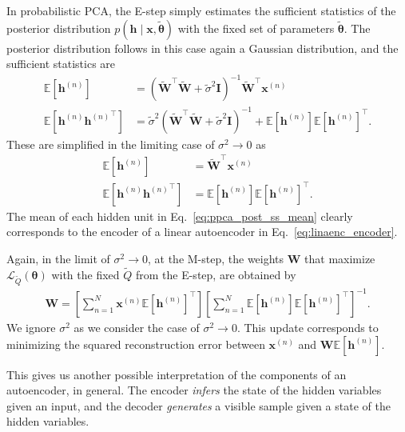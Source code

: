 \documentclass[dissertation,nocontribution,draft*]{aaltoseries}
\newcommand{\vect}[1]{\mathbf{#1}}
\newcommand{\vects}[1]{\boldsymbol{#1}}
\newcommand{\matr}[1]{\mathbf{#1}}
\newcommand{\vh}[0]{\vect{h}}
\newcommand{\vx}[0]{\vect{x}}
\newcommand{\mW}[0]{\matr{W}}
\newcommand{\mI}{\matr{I}}
\newcommand{\TT}[0]{{\vects{\theta}}}
\newcommand{\LL}[0]{\mathcal{L}}
\newcommand{\E}[0]{\mathbb{E}}
\begin{document}
In probabilistic PCA, the E-step simply estimates the
sufficient statistics of the posterior distribution $p(\vh
\mid \vx, \tilde{\TT})$ with the fixed set of parameters
$\tilde{\TT}$.
The posterior distribution follows in this case again a
Gaussian distribution, and the sufficient statistics are
\begin{align*}
    \E \left[ \vh^{(n)} \right] &= (\tilde{\mW}^\top
    \tilde{\mW} + \tilde{\sigma}^2
    \mI)^{-1} \tilde{\mW}^\top \vx^{(n)} \\
    \E \left[ \vh^{(n)} {\vh^{(n)}}^\top \right] &=
    \tilde{\sigma}^2 (\tilde{\mW}^\top \tilde{\mW} +
    \tilde{\sigma}^2
    \mI)^{-1} + \E\left[\vh^{(n)}\right] \E\left[ \vh^{(n)}
    \right]^\top.
\end{align*}
These are simplified in the limiting case of $\sigma^2 \to
0$ as
\begin{align}
    \label{eq:ppca_post_ss_mean}
    \E \left[ \vh^{(n)} \right] &= \tilde{\mW}^\top \vx^{(n)} \\
    \label{eq:ppca_post_ss_cov}
    \E \left[ \vh^{(n)} {\vh^{(n)}}^\top \right] &=
    \E\left[\vh^{(n)}\right] \E\left[ \vh^{(n)}
    \right]^\top.
\end{align}
The mean of each hidden unit in
Eq.~\eqref{eq:ppca_post_ss_mean} clearly corresponds to the
encoder of a linear autoencoder in
Eq.~\eqref{eq:linaenc_encoder}.

Again, in the limit of $\sigma^2 \to 0$, at the M-step, the
weights $\mW$ that maximize $\LL_{\tilde{Q}}(\TT)$ with the fixed
$\tilde{Q}$ from the E-step, are obtained by
\begin{align}
    \label{eq:ppca_m_weights}
    \mW = \left[ \sum_{n=1}^N \vx^{(n)} \E\left[ \vh^{(n)}
    \right]^\top \right]\left[ \sum_{n=1}^N \E\left[
    \vh^{(n)} \right] \E\left[ \vh^{(n)} \right]^\top
    \right]^{-1}.
\end{align}
We ignore $\sigma^2$ as we consider the case of $\sigma^2 \to
0$.  This update corresponds to minimizing the squared
reconstruction error between $\vx^{(n)}$ and $\mW
\E\left[\vh^{(n)}\right]$.


This gives us another possible interpretation of the
components of an autoencoder, in general. The encoder
\textit{infers} the state of the hidden variables given an
input, and the decoder \textit{generates} a visible sample
given a state of the hidden variables.
\end{document}

